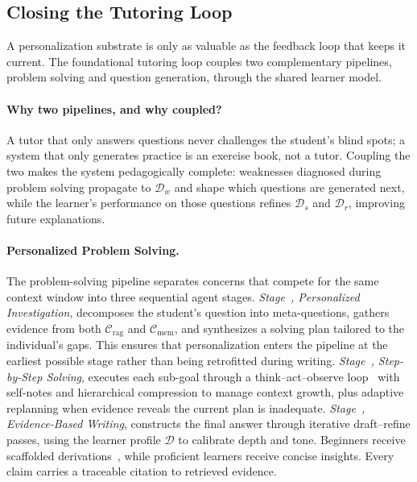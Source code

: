 \subsection{Closing the Tutoring Loop}
\label{sec:loop}

A personalization substrate is only as valuable as the feedback loop that keeps it current.
The foundational tutoring loop couples two complementary pipelines, problem solving and question generation, through the shared learner model.

\paragraph{Why two pipelines, and why coupled?}
A tutor that only answers questions never challenges the student's blind spots; a system that only generates practice is an exercise book, not a tutor.
Coupling the two makes the system pedagogically complete: weaknesses diagnosed during problem solving propagate to $\mathcal{D}_w$ and shape which questions are generated next, while the learner's performance on those questions refines $\mathcal{D}_s$ and $\mathcal{D}_r$, improving future explanations.

\paragraph{Personalized Problem Solving.}
The problem-solving pipeline separates concerns that compete for the same context window into three sequential agent stages.
\emph{Stage~, Personalized Investigation}, decomposes the student's question into meta-questions, gathers evidence from both $\mathcal{C}_{\text{rag}}$ and $\mathcal{C}_{\text{mem}}$, and synthesizes a solving plan tailored to the individual's gaps.
This ensures that personalization enters the pipeline at the earliest possible stage rather than being retrofitted during writing.
\emph{Stage~, Step-by-Step Solving}, executes each sub-goal through a think--act--observe loop~\citep{yao2023reactsynergizingreasoningacting} with self-notes and hierarchical compression to manage context growth, plus adaptive replanning when evidence reveals the current plan is inadequate.
\emph{Stage~, Evidence-Based Writing}, constructs the final answer through iterative draft--refine passes, using the learner profile $\mathcal{D}$ to calibrate depth and tone.
Beginners receive scaffolded derivations~\citep{wood1976role}, while proficient learners receive concise insights.
Every claim carries a traceable citation to retrieved evidence.

